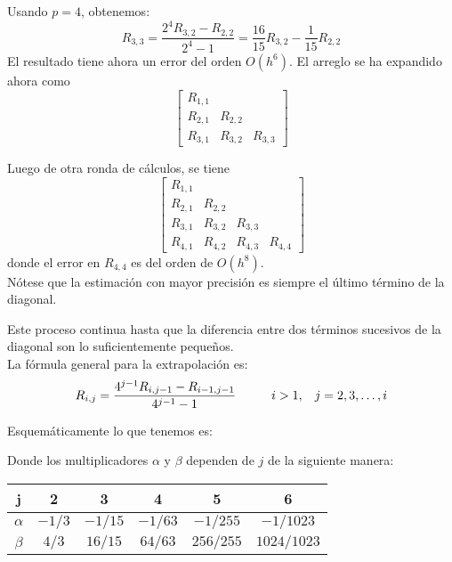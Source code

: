 \begin{frame}
Usando $p=4$, obtenemos:
\[ R_{3,3} = \dfrac{2^{4}R_{3,2}-R_{2,2}}{2^{4}-1} = \dfrac{16}{15} R_{3,2} - \dfrac{1}{15}R_{2,2} \]
El resultado tiene ahora un error del orden $O(h^{6})$. El arreglo se ha expandido ahora como
\[ \begin{bmatrix}
R_{1,1} &  & \\
R_{2,1} & R_{2,2} & \\
R_{3,1} & R_{3,2} & R_{3,3}
\end{bmatrix} \]
\end{frame}
\begin{frame}
Luego de otra ronda de c\'{a}lculos, se tiene
\[ \begin{bmatrix}
R_{1,1} &  & & \\
R_{2,1} & R_{2,2} & & \\
R_{3,1} & R_{3,2} & R_{3,3} & \\
R_{4,1} & R_{4,2} & R_{4,3} & R_{4,4}
\end{bmatrix} \]
donde el error en $R_{4,4}$ es del orden de $O(h^{8})$.
\\
\bigskip
N\'{o}tese que la estimaci\'{o}n con mayor precisi\'{o}n es siempre el \'{u}ltimo t\'{e}rmino de la diagonal.
\end{frame}
\begin{frame}
Este proceso continua hasta que la diferencia entre dos t\'{e}rminos sucesivos de la diagonal son lo suficientemente pequeños.
\\
\bigskip
La f\'{o}rmula general para la extrapolaci\'{o}n es:
\[ R_{i,j} = \dfrac{4^{j-1} R_{i,j-1} - R_{i-1,j-1} }{4^{j-1}-1} \hspace{1cm} i>1, \hspace{0.3cm} j=2,3,\ldots,i \]
\end{frame}
\begin{frame}[fragile]
Esquem\'{a}ticamente lo que tenemos es:
\begin{center}
\end{center}
Donde los multiplicadores $\alpha$ y $\beta$ dependen de $j$ de la siguiente manera:
\fontsize{12}{12}\selectfont
\begin{center}
\begin{tabular}{c | c | c | c | c | c}
\hline
j & 2 & 3 & 4 & 5 & 6 \\ \hline
$\alpha$ & $-1/3$ & $-1/15$ & $-1/63$ & $-1/255$ & $-1/1023$ \\ \hline
$\beta$ & $4/3$ & $16/15$ & $64/63$ & $256/255$ & $1024/1023$ \\ \hline
\end{tabular}
\end{center}
\end{frame}
